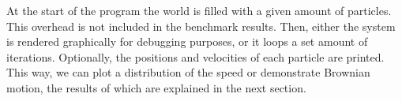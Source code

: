 At the start of the program the world is filled with a given amount of 
particles. This overhead is not included in the benchmark results. Then, either 
the system is rendered graphically for debugging purposes, or it loops a set 
amount of iterations.  Optionally, the positions and velocities of each 
particle are printed. This way, we can plot a distribution of the speed or 
demonstrate Brownian motion, the results of which are explained in the next 
section.


